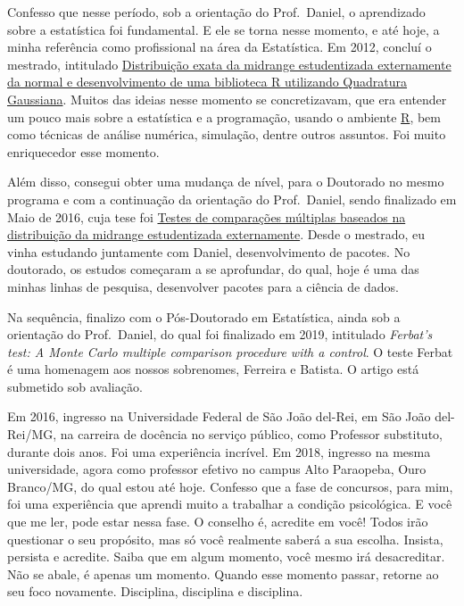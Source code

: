 \documentclass[
]{article}
\begin{document}
Confesso que nesse período, sob a orientação do Prof.~Daniel, o
aprendizado sobre a estatística foi fundamental. E ele se torna nesse
momento, e até hoje, a minha referência como profissional na área da
Estatística. Em 2012, concluí o mestrado, intitulado
\href{http://repositorio.ufla.br/bitstream/1/753/1/DISSERTA\%c3\%87\%c3\%83O_Distribui\%c3\%a7\%c3\%a3o\%20exata\%20da\%20midrange\%20estudentizada\%20externamente\%20da\%20normal\%20e\%20desenvolvimento\%20de\%20uma\%20biblioteca\%20R\%20utilizando\%20Quadratur.pdf}{Distribuição
exata da midrange estudentizada externamente da normal e desenvolvimento
de uma biblioteca R utilizando Quadratura Gaussiana}. Muitos das ideias
nesse momento se concretizavam, que era entender um pouco mais sobre a
estatística e a programação, usando o ambiente
\href{http://r-project.org/}{R}, bem como técnicas de análise numérica,
simulação, dentre outros assuntos. Foi muito enriquecedor esse momento.

Além disso, consegui obter uma mudança de nível, para o Doutorado no
mesmo programa e com a continuação da orientação do Prof.~Daniel, sendo
finalizado em Maio de 2016, cuja tese foi
\href{http://repositorio.ufla.br/bitstream/1/11466/2/TESE_Testes\%20de\%20compara\%c3\%a7\%c3\%b5es\%20m\%c3\%baltiplas\%20baseados\%20na\%20distribui\%c3\%a7\%c3\%a3o\%20da\%20midrange\%20estudentizada\%20externamente.pdf}{Testes
de comparações múltiplas baseados na distribuição da midrange
estudentizada externamente}. Desde o mestrado, eu vinha estudando
juntamente com Daniel, desenvolvimento de pacotes. No doutorado, os
estudos começaram a se aprofundar, do qual, hoje é uma das minhas linhas
de pesquisa, desenvolver pacotes para a ciência de dados.

Na sequência, finalizo com o Pós-Doutorado em Estatística, ainda sob a
orientação do Prof.~Daniel, do qual foi finalizado em 2019, intitulado
\emph{Ferbat's test: A Monte Carlo multiple comparison procedure with a
control}. O teste Ferbat é uma homenagem aos nossos sobrenomes, Ferreira
e Batista. O artigo está submetido sob avaliação.

Em 2016, ingresso na Universidade Federal de São João del-Rei, em São
João del-Rei/MG, na carreira de docência no serviço público, como
Professor substituto, durante dois anos. Foi uma experiência incrível.
Em 2018, ingresso na mesma universidade, agora como professor efetivo no
campus Alto Paraopeba, Ouro Branco/MG, do qual estou até hoje. Confesso
que a fase de concursos, para mim, foi uma experiência que aprendi muito
a trabalhar a condição psicológica. E você que me ler, pode estar nessa
fase. O conselho é, acredite em você! Todos irão questionar o seu
propósito, mas só você realmente saberá a sua escolha. Insista, persista
e acredite. Saiba que em algum momento, você mesmo irá desacreditar. Não
se abale, é apenas um momento. Quando esse momento passar, retorne ao
seu foco novamente. Disciplina, disciplina e disciplina.
\end{document}
